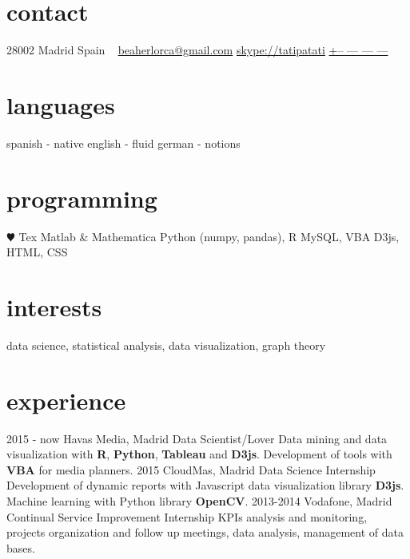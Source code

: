 \documentclass[]{friggeri-cv}
\begin{document}
\ifenglish
{}
       {}


\begin{aside}
  \section{contact}
    28002 Madrid
    Spain
    ~
    \href{mailto:beaherlorca@gmail.com}{beaherlorca@gmail.com}
    \href{skype:<tatipatati>[add]}{skype://tatipatati}
    \href{tel:xxxxxxxxxxx}{+-- --- --- ---}
  \section{languages}
    spanish - native
    english - fluid
    german - notions
  \section{programming}
    {\color{red} $\varheartsuit$} Tex
    Matlab \& Mathematica
    Python (numpy, pandas), R
    MySQL, VBA
    D3js, HTML, CSS
\end{aside}

\section{interests}

data science, statistical analysis, data visualization, graph theory

\section{experience}

\begin{entrylist}
  \entry
    {2015 - now}
    {Havas Media, Madrid}
    {Data Scientist/Lover}
    {Data mining and data visualization with \textbf{R}, \textbf{Python}, \textbf{Tableau} and \textbf{D3js}. Development of tools with \textbf{VBA} for media planners.}
  \entry
    {2015}
    {CloudMas, Madrid}
    {Data Science Internship}
    {Development of dynamic reports with Javascript data visualization library \textbf{D3js}. Machine learning with Python library \textbf{OpenCV}.}
  \entry
    {2013-2014}
    {Vodafone, Madrid}
    {Continual Service Improvement Internship}
    {KPIs analysis and monitoring, projects organization and follow up meetings, data analysis, management of data bases.}
\end{entrylist}
\end{document}

